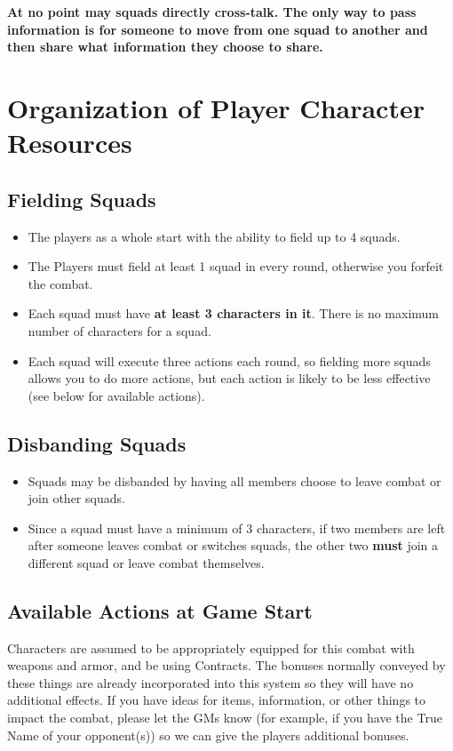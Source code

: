 \documentclass[green]{gl2018}
\begin{document}
{\bf At no point may squads directly cross-talk. The only way to pass information is for someone to move from one squad to another and then share what information they choose to share.}

\section*{Organization of Player Character Resources}
\subsection*{Fielding Squads}
\begin{itemize}
	\item The players as a whole start with the ability to field up to 4 squads. 
	\item The Players must field at least 1 squad in every round, otherwise you forfeit the combat.
	\item Each squad must have {\bf at least 3 characters in it}. There is no maximum number of characters for a squad.
	\item Each squad will execute three actions each round, so fielding more squads allows you to do more actions, but each action is likely to be less effective (see below for available actions).
\end{itemize}

\subsection*{Disbanding Squads}
\begin{itemize}
	\item Squads may be disbanded by having all members choose to leave combat or join other squads.
	\item Since a squad must have a minimum of 3 characters, if two members are left after someone leaves combat or switches squads, the other two {\bf must} join a different squad or leave combat themselves.
\end{itemize}

\subsection*{Available Actions at Game Start}
Characters are assumed to be appropriately equipped for this combat with weapons and armor, and be using Contracts. The bonuses normally conveyed by these things are already incorporated into this system so they will have no additional effects. If you have ideas for items, information, or other things to impact the combat, please let the GMs know (for example, if you have the True Name of your opponent(s)) so we can give the players additional bonuses.
\end{document}
